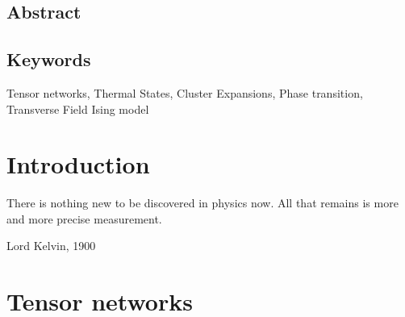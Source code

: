\documentclass{book}
\newcounter{a}
\newcounter{b}
\begin{document}

\section*{Abstract}




\section*{Keywords}

Tensor networks, Thermal States, Cluster Expansions, Phase transition, Transverse Field Ising model

\newpage




\setcounter{tocdepth}{3}
\tableofcontents

\newpage


\printglossary[type=\acronymtype]




\mainmatter


\chapter{Introduction}\label{chap1}

\epigraph{There is nothing new to be discovered in physics now. All that remains is more and more precise measurement.}{Lord Kelvin, 1900}



\chapter{Tensor networks}\label{chap2}
\end{document}
